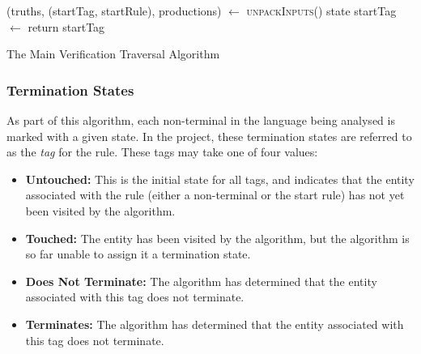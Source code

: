 \begin{algorithm}
\begin{algorithmic}
\State
\State (truths, (startTag, startRule), productions) $\gets$ \textsc{unpackInputs}()
\Comment state
\State
\State startTag $\gets$ 
\State return startTag
\State
{}
    \If 
\EndFunction
\end{algorithmic}
\caption{The Main Verification Traversal Algorithm}
\label{alg:the_main_verification_traversal_algorithm}
\end{algorithm}

\subsubsection{Termination States} %
\label{ssub:termination_states}
As part of this algorithm, each non-terminal in the language being analysed is marked with a given state.
In the project, these termination states are referred to as the \textit{tag} for the rule.
These tags may take one of four values:
\begin{itemize}
    \item \textbf{Untouched:} This is the initial state for all tags, and indicates that the entity associated with the rule (either a non-terminal or the start rule) has not yet been visited by the algorithm.
    \item \textbf{Touched:} The entity has been visited by the algorithm, but the algorithm is so far unable to assign it a termination state.
    \item \textbf{Does Not Terminate:} The algorithm has determined that the entity associated with this tag does not terminate. 
    \item \textbf{Terminates:} The algorithm has determined that the entity associated with this tag does not terminate.
\end{itemize}

